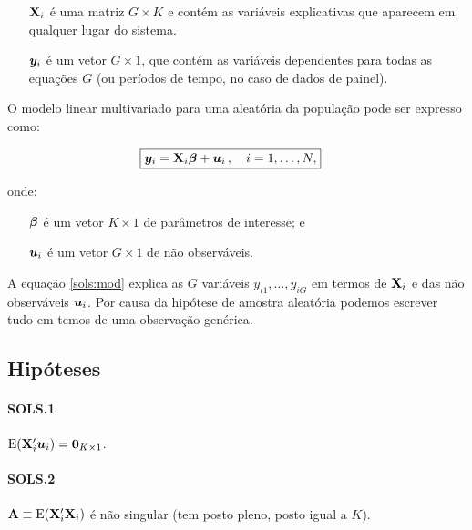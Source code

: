 \documentclass[11pt, oneside, a4paper, article]{article}
\numberwithin{equation}{section}
\begin{document}
\vspace{-1 em}
\begin{itemize}[itemsep = -1ex]
\item [$\mathbf{X}_{i}$]  é uma matriz $G \times K$ e contém as variáveis explicativas que aparecem em qualquer lugar do sistema.
\item [$\boldsymbol{y}_{i}$]  é um vetor $G \times 1$, que contém as variáveis dependentes para todas as equações $G$ (ou períodos de tempo, no caso de dados de painel).
\end{itemize}

O modelo linear multivariado para uma  aleatória da população pode ser expresso como:

\vspace{-1 em}
\begin{align}\label{sols:mod}
	\Aboxed{
	\yvec_{i} = \Xmat_{i} \betavec + \uvec_{i} \, , \quad i=1, \dots, N,
}
\end{align}

\noindent
onde:

\vspace{-1 em}
\begin{itemize}[itemsep = -1ex]
\item [$\boldsymbol{\beta}$] é um vetor $K \times 1$ de parâmetros de interesse; e
\item [$\boldsymbol{u}_{i}$] é um vetor $G \times 1$ de não observáveis.
\end{itemize}

A equação \eqref{sols:mod} explica as $G$ variáveis $y_{i1}, \dots, y_{iG}$ em termos de $\mathbf{X}_{i}$ e das não observáveis $\boldsymbol{u}_{i}$.
Por causa da hipótese de amostra aleatória podemos escrever tudo em temos de uma observação genérica.

\subsection{Hipóteses}
\noindent
\citet[Sec.7.3.1]{wool-2010}

\paragraph{SOLS.1} $\text{E}(\mathbf{X}_{i}' \boldsymbol{u}_{i}) = \boldsymbol{0}_{K \times 1}$.
		
\paragraph{SOLS.2} $\mathbf{A} \equiv \text{E}( \mathbf{X}_{i}' \mathbf{X}_{i} )$ é não singular (tem posto pleno, posto igual a $K$). 
\end{document}
